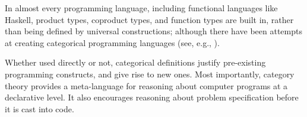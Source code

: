 In almost every programming language, including functional languages
like Haskell, product types, coproduct types, and function types are
built in, rather than being defined by universal constructions; although
there have been attempts at creating categorical programming languages
(see, e.g.,
).

Whether used directly or not, categorical definitions justify
pre-existing programming constructs, and give rise to new ones. Most
importantly, category theory provides a meta-language for reasoning
about computer programs at a declarative level. It also encourages
reasoning about problem specification before it is cast into code.